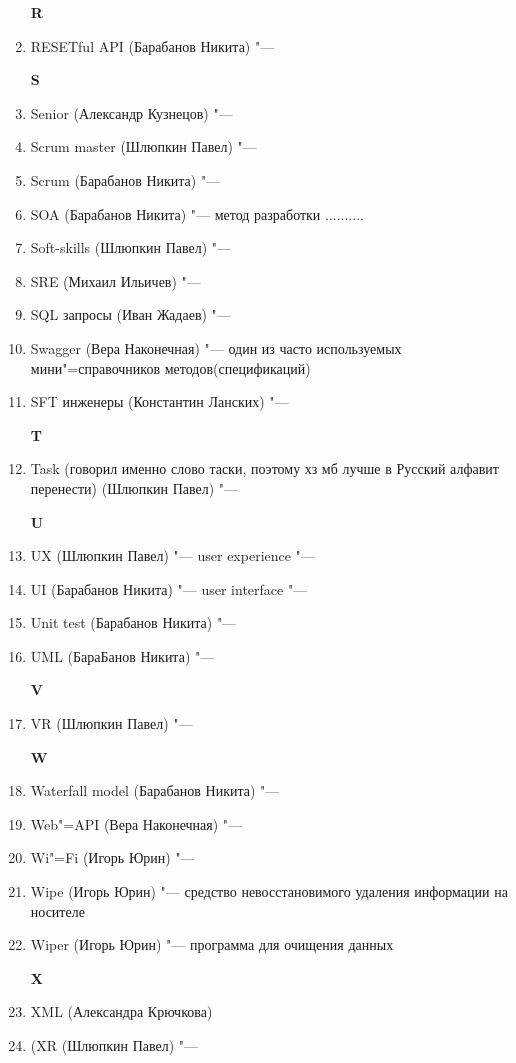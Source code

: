 \documentclass{article}
\begin{document}
\begin{enumerate}
    
    \textbf{R}
    \item {RESETful API (Барабанов Никита) "--- }

    \textbf{S}
    \item {Senior (Александр Кузнецов) "---}
    \item {Scrum master (Шлюпкин Павел) "---}
    
    \item {Scrum (Барабанов Никита) "--- }
    \item {SOA (Барабанов Никита) "--- метод разработки ..........}
    \item {Soft-skills (Шлюпкин Павел) "---}
    \item {SRE (Михаил Ильичев) "--- }
    \item {SQL запросы (Иван Жадаев) "--- }
    
    \item {Swagger (Вера Наконечная) "--- один из часто используемых мини"=справочников методов(спецификаций)}
    \item {SFT инженеры (Константин Ланских) "--- }

    \textbf{T}
    \item {Task (говорил именно слово таски, поэтому хз мб лучше в Русский алфавит перенести) (Шлюпкин Павел) "--- }

    \textbf{U}
    \item {UX (Шлюпкин Павел) "--- user experience "---}
    \item {UI (Барабанов Никита) "--- user interface "---}
    \item {Unit test (Барабанов Никита) "---}
    \item {UML (БараБанов Никита) "--- }

    \textbf{V}
    \item {VR (Шлюпкин Павел) "--- }

    \textbf{W}
    \item {Waterfall model (Барабанов Никита) "--- }
    \item {Web"=API (Вера Наконечная) "---}
    \item {Wi"=Fi (Игорь Юрин) "---}
    \item {Wipe (Игорь Юрин) "--- средство невосстановимого удаления информации на носителе}
    \item {Wiper (Игорь Юрин) "--- программа для очищения данных }
    
    
    \textbf{X}
    \item {XML (Александра Крючкова)}
    \item {(XR (Шлюпкин Павел) "---}
    

\end{enumerate}
\end{document}
